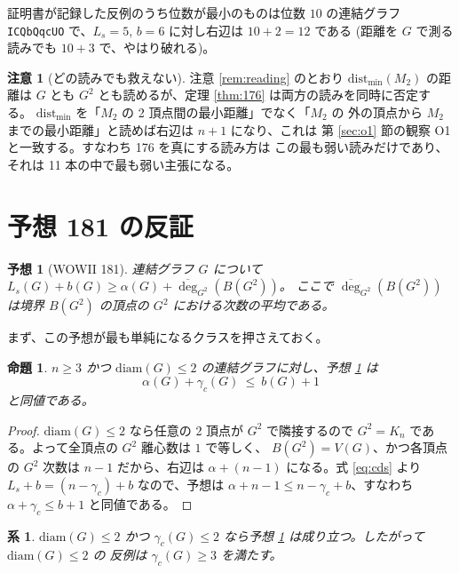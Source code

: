 \documentclass[paper=a4,fontsize=10.5pt,jafontsize=10.5pt]{jlreq}
\theoremstyle{plain}
\newtheorem{proposition}[theorem]{命題}
\newtheorem{corollary}[theorem]{系}
\newtheorem{conjecture}[theorem]{予想}
\theoremstyle{definition}
\newtheorem{remark}[theorem]{注意}
\begin{document}
証明書が記録した反例のうち位数が最小のものは位数 $10$ の連結グラフ \texttt{ICQbQqcUO} で、$L_s = 5$, $b = 6$ に対し右辺は $10 + 2 = 12$ である (距離を $G$ で測る読みでも $10 + 3$ で、やはり破れる)。

\begin{remark}[どの読みでも救えない]\label{rem:176read}
注意 \ref{rem:reading} のとおり $\mathrm{dist}_{\min}(M_2)$ の距離は
$G$ とも $G^2$ とも読めるが、定理 \ref{thm:176} は両方の読みを同時に否定する。
$\mathrm{dist}_{\min}$ を「$M_2$ の 2 頂点間の最小距離」でなく「$M_2$ の
外の頂点から $M_2$ までの最小距離」と読めば右辺は $n + 1$ になり、これは
第 \ref{sec:o1} 節の観察 O1 と一致する。すなわち 176 を真にする読み方は
この最も弱い読みだけであり、それは 11 本の中で最も弱い主張になる。
\end{remark}

\section{予想 181 の反証}\label{sec:181}

\begin{conjecture}[WOWII 181]\label{conj:181}
連結グラフ $G$ について
$L_s(G) + b(G) \ge \alpha(G) + \overline{\deg}_{G^2}(B(G^2))$。
ここで $\overline{\deg}_{G^2}(B(G^2))$ は境界 $B(G^2)$ の頂点の
$G^2$ における次数の平均である。
\end{conjecture}

まず、この予想が最も単純になるクラスを押さえておく。

\begin{proposition}\label{prop:181diam2}
$n \ge 3$ かつ $\mathrm{diam}(G) \le 2$ の連結グラフに対し、予想
\ref{conj:181} は
\[ \alpha(G) + \gamma_c(G) \ \le \ b(G) + 1 \]
と同値である。
\end{proposition}

\begin{proof}
$\mathrm{diam}(G) \le 2$ なら任意の 2 頂点が $G^2$ で隣接するので
$G^2 = K_n$ である。よって全頂点の $G^2$ 離心数は $1$ で等しく、
$B(G^2) = V(G)$、かつ各頂点の $G^2$ 次数は $n - 1$ だから、右辺は
$\alpha + (n-1)$ になる。式 \eqref{eq:cds} より
$L_s + b = (n - \gamma_c) + b$ なので、予想は
$\alpha + n - 1 \le n - \gamma_c + b$、すなわち
$\alpha + \gamma_c \le b + 1$ と同値である。
\end{proof}

\begin{corollary}\label{cor:181diam2}
$\mathrm{diam}(G) \le 2$ かつ $\gamma_c(G) \le 2$ なら予想
\ref{conj:181} は成り立つ。したがって $\mathrm{diam}(G) \le 2$ の
反例は $\gamma_c(G) \ge 3$ を満たす。
\end{corollary}
\end{document}
